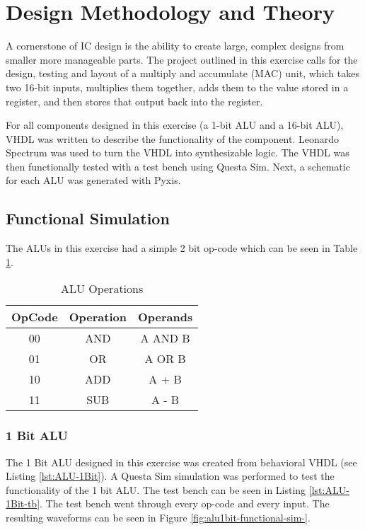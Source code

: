 \documentclass[11pt]{article}
\begin{document}
\section{Design Methodology and Theory}

	A cornerstone of IC design is the ability to create large, complex designs from smaller more manageable parts. The project outlined in this exercise calls for the design, testing and layout of a multiply and accumulate (MAC) unit, which takes two 16-bit inputs, multiplies them together, adds them to the value stored in a register, and then stores that output back into the register.
	
	For all components designed in this exercise (a 1-bit ALU and a 16-bit ALU), VHDL was written to describe the functionality of the component. Leonardo Spectrum was used to turn the VHDL into synthesizable logic. The VHDL was then functionally tested with a test bench using Questa Sim. Next, a schematic for each ALU was generated with Pyxis. 
	

	\subsection{Functional Simulation}
	
		The ALUs in this exercise had a simple 2 bit op-code which can be seen in Table \ref{tab:OpCodes}.
	
		\begin{table}[H]
			\centering
			\caption{ALU Operations}
			\label{tab:OpCodes}
			\begin{tabular}{|ccc|}
				\hline
				\textbf{OpCode} & \textbf{Operation} & \textbf{Operands} \\
				\hline
				00              & AND                & A AND B           \\
				01              & OR                 & A OR B            \\
				10              & ADD                & A + B             \\
				11              & SUB                & A - B   \\   
				\hline       
			\end{tabular}
		\end{table}
	
		\subsubsection{1 Bit ALU}
		
			The 1 Bit ALU designed in this exercise was created from behavioral VHDL (see Listing \ref{lst:ALU-1Bit}). A Questa Sim simulation was performed to test the functionality of the 1 bit ALU. The test bench can be seen in Listing \ref{lst:ALU-1Bit-tb}. The test bench went through every op-code and every input. The resulting waveforms can be seen in Figure \ref{fig:alu1bit-functional-sim-}.
		
\end{document}
